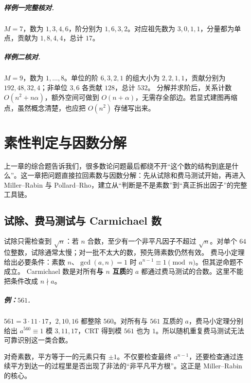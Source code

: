 \paragraph{样例一完整核对.}
$M=7$，数为 $1,3,4,6$，阶分别为 $1,6,3,2$。对应祖先数为 $3,0,1,1$，分量都为单点，贡献为 $1,8,4,4$，总计 $17$。
\paragraph{样例二核对.}
$M=9$，数为 $1,\ldots,8$。单位的阶 $6,3,2,1$ 的组大小为 $2,2,1,1$，贡献分别为 $192,48,32,4$；非单位 $3,6$ 各贡献 $128$，总计 $532$。
\cost 分解并求阶后，关系计数 $O(n^2+n\alpha)$，额外空间可做到 $O(n+\alpha)$，无需存全部边。若显式建图再缩点，虽然概念清楚，也应把 $O(n^2)$ 存储写出来。



\chapter{素性判定与因数分解}
\begin{chapterintro}[章节导读]
上一章的综合题告诉我们，很多数论问题最后都绕不开“这个数的结构到底是什么”。这一章把问题直接拉回素数与因数分解：先从试除和费马测试开始，再进入 Miller--Rabin 与 Pollard--Rho，建立从“判断是不是素数”到“真正拆出因子”的完整工具链。
\end{chapterintro}

\section{试除、费马测试与 Carmichael 数}
试除只需检查到 $\sqrt n$：若 $n$ 合数，至少有一个非平凡因子不超过 $\sqrt n$。对单个 $64$ 位整数，试除通常太慢；对一批不太大的数，预先筛素数仍然有效。
费马小定理给出必要条件：素数 $n$、$\gcd(a,n)=1$ 时 $a^{n-1}\equiv1\pmod n$。但其逆命题不成立。
Carmichael 数是对所有\textbf{与 $n$ 互质}的 $a$ 都通过费马测试的合数。这里不能把条件改成 $n\nmid a$。


\paragraph{例：$561$.} $561=3\cdot11\cdot17$，$2,10,16$ 都整除 $560$。对所有与 $561$ 互质的 $a$，费马小定理分别给出 $a^{560}\equiv1$ 模 $3,11,17$，CRT 得到模 $561$ 也为 $1$。所以随机重复费马测试无法可靠识别这一类合数。
\begin{teach}[从必要条件寻找更强必要条件]
对奇素数，平方等于一的元素只有 $\pm1$。不仅要检查最终 $a^{n-1}$，还要检查通过连续平方到达一的过程里是否出现了非法的“非平凡平方根”。这正是 Miller--Rabin 的核心。
\end{teach}

